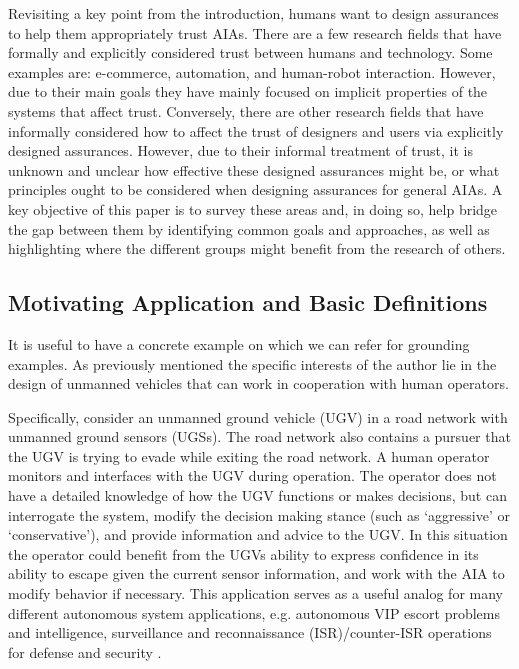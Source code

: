     Revisiting a key point from the introduction, humans want to design assurances to help them appropriately trust AIAs. There are a few research fields that have formally and explicitly considered trust between humans and technology. Some examples are: e-commerce, automation, and human-robot interaction. However, due to their main goals they have mainly focused on implicit properties of the systems that affect trust. Conversely, there are other research fields that have informally considered how to affect the trust of designers and users via explicitly designed assurances. However, due to their informal treatment of trust, it is unknown and unclear how effective these designed assurances might be, or what principles ought to be considered when designing assurances for general AIAs. A key objective of this paper is to survey these areas and, in doing so, help bridge the gap between them by identifying common goals and approaches, as well as highlighting where the different groups might benefit from the research of others.

\subsection{Motivating Application and Basic Definitions} \label{sec:mot_example}
    It is useful to have a concrete example on which we can refer for grounding examples. As previously mentioned the specific interests of the author lie in the design of unmanned vehicles that can work in cooperation with human operators.

    Specifically, consider an unmanned ground vehicle (UGV) in a road network with unmanned ground sensors (UGSs). The road network also contains a pursuer that the UGV is trying to evade while exiting the road network. A human operator monitors and interfaces with the UGV during operation. The operator does not have a detailed knowledge of how the UGV functions or makes decisions, but can interrogate the system, modify the decision making stance (such as `aggressive' or `conservative'), and provide information and advice to the UGV. In this situation the operator could benefit from the UGVs ability to express confidence in its ability to escape given the current sensor information, and work with the AIA to modify behavior if necessary. This application serves as a useful analog for many different autonomous system applications, e.g. autonomous VIP escort problems and intelligence, surveillance and reconnaissance (ISR)/counter-ISR operations for defense and security \cite{Kingston2012-va}.
   
